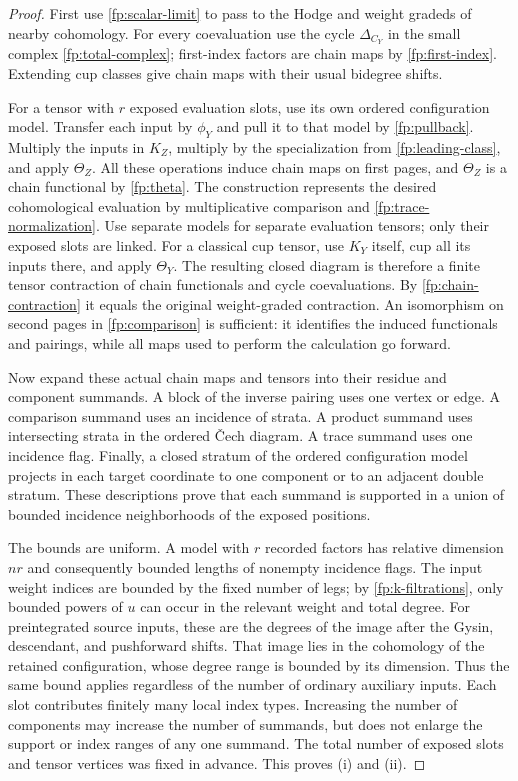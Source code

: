 \begin{proof}
First use \cref{fp:scalar-limit} to pass to the Hodge and weight gradeds of
nearby cohomology.  For every coevaluation use the cycle
$\Delta_{C_Y}$ in the small complex \eqref{fp:total-complex}; first-index
factors are chain maps by \cref{fp:first-index}.  Extending cup classes give
chain maps with their usual bidegree shifts.

For a tensor with $r$ exposed evaluation slots, use its own ordered
configuration model.  Transfer each input by $\phi_Y$ and pull it to that
model by \cref{fp:pullback}.  Multiply the inputs in $K_Z$, multiply by the
specialization from \cref{fp:leading-class}, and apply $\Theta_Z$.  All these
operations induce chain maps on first pages, and $\Theta_Z$ is a chain
functional by \eqref{fp:theta}.  The construction represents the desired
cohomological evaluation by multiplicative comparison and
\cref{fp:trace-normalization}.  Use separate models for separate evaluation
tensors; only their exposed slots are linked.  For a classical cup tensor,
use $K_Y$ itself, cup all its inputs there, and apply $\Theta_Y$.  The resulting
closed diagram is therefore a finite tensor contraction of chain functionals
and cycle coevaluations.  By \cref{fp:chain-contraction} it equals the original
weight-graded contraction.  An isomorphism on second pages in
\eqref{fp:comparison} is sufficient: it identifies the induced functionals
and pairings, while all maps used to perform the calculation go forward.

Now expand these actual chain maps and tensors into their residue and
component summands.  A block of the inverse pairing uses one vertex or edge.
A comparison summand uses an incidence of strata.  A product summand uses
intersecting strata in the ordered \v{C}ech diagram.  A trace summand uses
one incidence flag.  Finally, a closed stratum of the ordered configuration
model projects in each target coordinate to one component or to an adjacent
double stratum.  These descriptions prove that each summand is supported in
a union of bounded incidence neighborhoods of the exposed positions.

The bounds are uniform.  A model with $r$ recorded factors has relative
dimension $nr$ and consequently bounded lengths of nonempty incidence flags.
The input weight indices are bounded by the fixed number of legs; by
\eqref{fp:k-filtrations}, only bounded powers of $u$ can occur in the relevant
weight and total degree.  For preintegrated source inputs, these are the
degrees of the image after the Gysin, descendant, and pushforward shifts.
That image lies in the cohomology of the retained configuration, whose
degree range is bounded by its dimension.  Thus the same bound applies
regardless of the number of ordinary auxiliary inputs.
Each slot contributes finitely many local index
types.  Increasing the number of components may increase the number of
summands, but does not enlarge the support or index ranges of any one
summand.  The total number of exposed slots and tensor vertices was fixed in
advance.  This proves (i) and (ii).


\end{proof}
